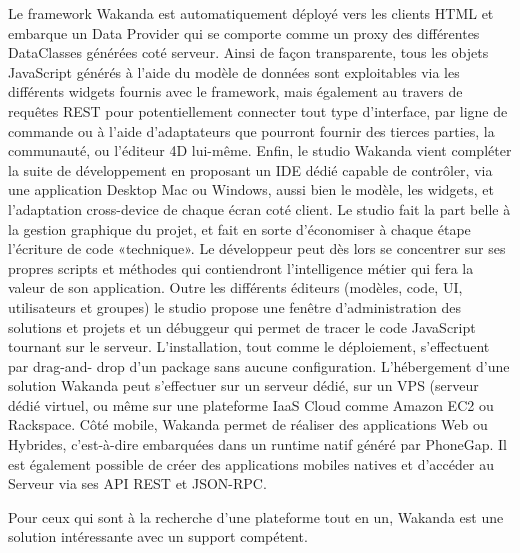 Le framework Wakanda est automatiquement déployé vers les clients HTML et embarque un Data Provider qui se comporte comme un proxy des différentes DataClasses générées coté serveur. Ainsi de façon transparente, tous les objets JavaScript générés à l’aide du modèle de données sont exploitables via les différents widgets fournis avec le framework, mais également au travers de requêtes REST pour potentiellement connecter tout type d’interface, par ligne de commande ou à l’aide d’adaptateurs que pourront fournir des tierces parties, la communauté, ou l’éditeur 4D lui-même.
Enfin, le studio Wakanda vient compléter la suite de développement en proposant un IDE dédié capable de contrôler, via une application Desktop Mac ou Windows, aussi bien le modèle, les widgets, et l’adaptation cross-device de chaque écran coté client. Le studio fait la part belle à la gestion graphique du projet, et fait en sorte d’économiser à chaque étape l’écriture de code «technique». Le développeur peut dès lors se concentrer sur ses propres scripts et méthodes qui contiendront l’intelligence métier qui fera la valeur de son application. Outre les différents éditeurs (modèles, code, UI, utilisateurs et groupes) le studio propose une fenêtre d’administration des solutions et projets et un débuggeur qui permet de tracer le code JavaScript tournant sur le serveur. L’installation, tout comme le déploiement, s’effectuent par drag-and- drop d’un package sans aucune configuration. L’hébergement d’une solution Wakanda peut s’effectuer sur un serveur dédié, sur un VPS (serveur dédié virtuel, ou même sur une plateforme IaaS Cloud comme Amazon EC2 ou Rackspace. Côté mobile, Wakanda permet de réaliser des applications Web ou Hybrides, c’est-à-dire embarquées dans un runtime natif généré par PhoneGap. Il est également possible de créer des applications mobiles natives et d’accéder au Serveur via ses API REST et JSON-RPC.


Pour ceux qui sont à la recherche d'une plateforme tout en un, Wakanda est une solution intéressante avec un support compétent.